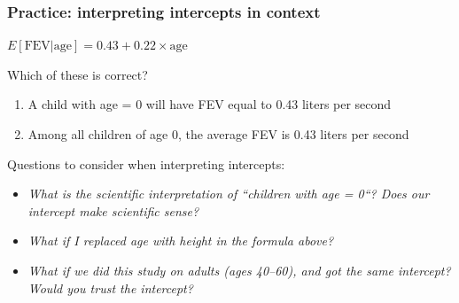 \documentclass[12pt, 
hyperref={colorlinks=true, linkcolor=blue, urlcolor=cyan},dvipsnames]{beamer}
\begin{document}
\begin{frame}
\frametitle{Practice: interpreting intercepts in context}

\begin{center} $E[\text{FEV} | \text{age}] = 0.43 + 0.22 \times \text{age}$ \end{center} 

\vspace{-0.3cm} Which of these is correct? \vspace{-0.3cm}
\begin{enumerate}
\item A child with age = $0$ will have FEV equal to 0.43 liters per second
\item Among all children of age 0, the average FEV is 0.43 liters per second \vspace{-0.2cm}
\end{enumerate} \pause

\color{red} Questions to consider when interpreting intercepts: \vspace{-0.3cm} \color{black}
\begin{itemize}
\item \textit{What is the scientific interpretation of ``children with age = 0``? Does our intercept make scientific sense?} \\ \pause  %
\item \textit{What if I replaced age with height in the formula above?} \\ \pause %
\item \textit{What if we did this study on adults (ages 40--60), and got the same intercept? Would you trust the intercept?} %
\end{itemize}

\end{frame}
\end{document}

